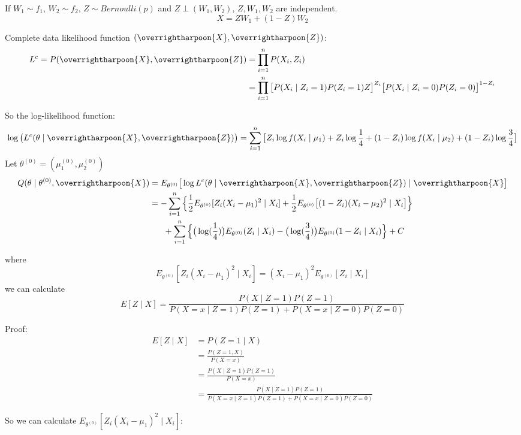 \documentclass[
  14pt,
]{article}
\begin{document}
If \(W_1\sim f_1\), \(W_2\sim f_2\), \(Z\sim Bernoulli(p)\) and
\(Z\perp(W_1,W_2)\), \(Z,W_1,W_2\) are independent. \[
X=ZW_1+(1-Z)W_2
\]

Complete data likelihood function
\((\overrightharpoon{X},\overrightharpoon{Z})\):\\
\[
\begin{aligned}
L^c=P(\overrightharpoon{X},\overrightharpoon{Z})&=\prod\limits_{i=1}^{n}P(X_i,Z_i)\\
&=\prod\limits_{i=1}^{n}\big[P(X_i\mid Z_i=1)P(Z_i=1)Z\big]^{Z_i}\big[P(X_i\mid Z_i=0)P(Z_i=0)\big]^{1-Z_i}
\end{aligned}
\]

So the log-likelihood function: \[
\log\big(L^c(\theta\mid\overrightharpoon{X}, \overrightharpoon{Z})\big)=\sum\limits_{i=1}^{n}\big[Z_i\log f(X_i\mid \mu_1)+Z_i\log\frac{1}{4}+(1-Z_i)\log f(X_i\mid \mu_2)+(1-Z_i)\log\frac{3}{4}\big]
\] Let \(\theta^{(0)}=(\mu_1^{(0)},\mu_2^{(0)})\)\\
\[
\begin{aligned}
Q(\theta\mid\theta^{(0)},\overrightharpoon{X})&=E_{\theta^{(0)}}\big[\log L^c(\theta\mid\overrightharpoon{X},\overrightharpoon{Z})\mid\overrightharpoon{X}\big]\\
&=-\sum\limits_{i=1}^{n}\Big\{\frac{1}{2}E_{\theta^{(0)}}[Z_i(X_i-\mu_1)^2\mid X_i]+\frac{1}{2}E_{\theta^{(0)}}\big[(1-Z_i)(X_i-\mu_2)^2\mid X_i\big]\Big\}\\
&\ \ \ \ \ +\sum\limits_{i=1}^{n}\Big\{\big(\log(\frac{1}{4})\big) E_{\theta^{(0)}}(Z_i\mid X_i)-\big( \log(\frac{3}{4}) \big) E_{\theta^{(0)}}(1-Z_i\mid X_i)\Big\}+C
\end{aligned}
\]

where \[
E_{\theta^{(0)}}[Z_i(X_i-\mu_1)^2\mid X_i]=(X_i-\mu_1)^2E_{\theta^{(0)}}[Z_i\mid X_i]
\] we can calculate
\[E[Z\mid X]=\frac{P(X\mid Z=1)P(Z=1)}{P(X=x\mid Z=1)P(Z=1)+P(X=x\mid Z=0)P(Z=0)}\]

\begin{mdframed}
Proof: 
\begin{align*}
E[Z\mid X]&= P(Z=1\mid X)\\
&=\frac{P(Z=1, X)}{P(X=x)}\\
&=\frac{P(X\mid Z=1)P(Z=1)}{P(X=x)}\\
&=\frac{P(X\mid Z=1)P(Z=1)}{P(X=x\mid Z=1)P(Z=1)+P(X=x\mid Z=0)P(Z=0)}
\end{align*}
\end{mdframed}

So we can calculate \(E_{\theta^{(0)}}[Z_i(X_i-\mu_1)^2\mid X_i]\):
\end{document}
